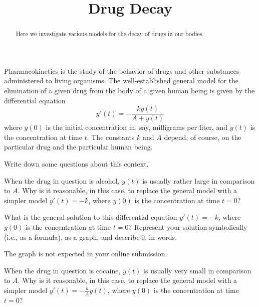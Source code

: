 \documentclass{ximera}
\title{Drug Decay}
\begin{document}
\begin{abstract}
Here we investigate various models for the decay of drugs in our bodies.  
\end{abstract}
\maketitle

Pharmacokinetics is the study of the behavior of drugs and other substances administered to living organisms.  
The well-established general model for 
the elimination of a given drug from the body of a given human being is given by the differential equation 
$$y'(t)=-\frac{ky(t)}{A+y(t)}$$
where $y(0)$ is the initial concentration in, say, milligrams per liter, and $y(t)$ is the concentration at time $t$.  The constants $k$ and $A$ depend, of course, on the particular drug and the particular human being. 

\begin{question}
Write down some questions about this context.       
\begin{freeResponse}
\end{freeResponse}
\end{question}


\begin{question}
When the drug in question is alcohol, $y(t)$ is usually rather large in comparison to $A$.   Why is it reasonable, in this case, to replace the general model with a simpler model $y'(t)=-k$, where $y(0)$ is the concentration at time $t=0$?  
\begin{freeResponse}
\end{freeResponse}
\end{question}


\begin{question}
What is the general solution to this differential equation $y'(t)=-k$, where $y(0)$ is the concentration at time $t=0$?   Represent your solution symbolically (i.e., as a formula), as a graph, and describe it in words.  
\begin{prompt}
The graph is not expected in your online submission.  
\end{prompt}
\begin{freeResponse}
\end{freeResponse}
\end{question}


\begin{question}
When the drug in question is cocaine, $y(t)$ is usually very small in comparison to $A$.   Why is it reasonable, in this case, to replace the general model with a simpler model $y'(t)=-\frac{k}{A}y(t)$, where $y(0)$ is the concentration at time $t=0$?  
\begin{freeResponse}
\end{freeResponse}
\end{question}
\end{document}
